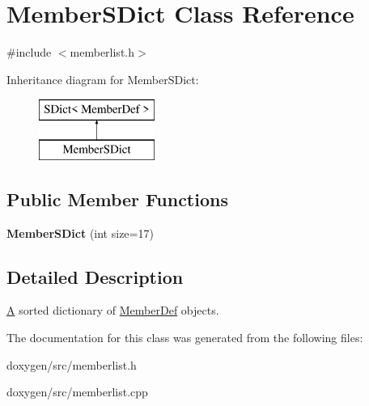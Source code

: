 \hypertarget{class_member_s_dict}{}\section{Member\+S\+Dict Class Reference}
\label{class_member_s_dict}


{\ttfamily \#include $<$memberlist.\+h$>$}

Inheritance diagram for Member\+S\+Dict\+:\begin{figure}[H]
\begin{center}
\leavevmode
\includegraphics[height=2.000000cm]{class_member_s_dict}
\end{center}
\end{figure}
\subsection*{Public Member Functions}
\begin{DoxyCompactItemize}
\item 
\mbox{\label{class_member_s_dict_a108f18271926bf4be8d3ec9a9f7ecb5a}} 
{\bfseries Member\+S\+Dict} (int size=17)
\end{DoxyCompactItemize}


\subsection{Detailed Description}
\mbox{\hyperlink{class_a}{A}} sorted dictionary of \mbox{\hyperlink{class_member_def}{Member\+Def}} objects. 

The documentation for this class was generated from the following files\+:\begin{DoxyCompactItemize}
\item 
doxygen/src/memberlist.\+h\item 
doxygen/src/memberlist.\+cpp\end{DoxyCompactItemize}
